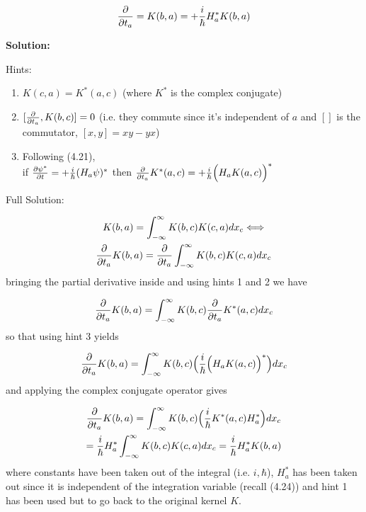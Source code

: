 \documentclass{article}
\begin{document}
\begin{equation*}
    \pdv{}{t_{a}} = K(b,a) = +\frac{i}{\hbar}H_{a}^{*}K(b,a) 
\end{equation*}

\textbf{Solution:} 

Hints: 

\begin{enumerate}
    \item $K(c,a) = K^{*}(a,c)$ (where $K^{*}$ is the complex conjugate)
    \item $[\pdv{}{t_{a}}, K(b,c)] = 0$ (i.e. they commute since it's independent of $a$ and $[ ]$ is the commutator, $[x,y] = xy - yx$)
    \item Following (4.21), \\ 
    if $\pdv{\psi ^{*}}{t} = +\frac{i}{\hbar}(H_{a}\psi)^{*}$ then $\pdv{}{t_{a}}K^{*}(a,c) = +\frac{i}{\hbar}\Big(H_{a}K(a,c)\Big)^{*} $
\end{enumerate}
    
Full Solution: 

\begin{multline*}
    K(b,a) = \int_{-\infty}^{\infty} K(b,c)K(c,a) dx_{c} \Longleftrightarrow \\ \pdv{}{t_{a}} K(b,a) =  \pdv{}{t_{a}} \int_{-\infty}^{\infty} K(b,c)K(c,a) dx_{c}
\end{multline*}
bringing the partial derivative inside and using hints 1 and 2 we have

\begin{equation*}
    \pdv{}{t_{a}} K(b,a) = \int_{-\infty}^{\infty} K(b,c) \pdv{}{t_{a}} K^{*}(a,c) dx_{c}
\end{equation*}
so that using hint 3 yields
 
\begin{equation*}
    \pdv{}{t_{a}} K(b,a) = \int_{-\infty}^{\infty} K(b,c) \Big( \frac{i}{\hbar}\Big(H_{a}K(a,c)\Big)^{*} \Big) dx_{c}
\end{equation*}
and applying the complex conjugate operator gives 

\begin{multline*}
    \pdv{}{t_{a}} K(b,a) = \int_{-\infty}^{\infty} K(b,c) \Big(  \frac{i}{\hbar} K^{*}(a,c)H_{a}^{*} \Big) dx_{c} \\ = \frac{i}{\hbar} H_{a}^{*} \int_{-\infty}^{\infty} K(b,c) K(c,a) dx_{c} = \frac{i}{\hbar} H_{a}^{*} K(b,a)
\end{multline*}
where constants have been taken out of the integral (i.e. $i, \hbar$), $H_{a}^{*}$ has been taken out since it is independent of the integration variable (recall (4.24)) and hint 1 has been used but to go back to the original kernel $K$. 
\end{document}
